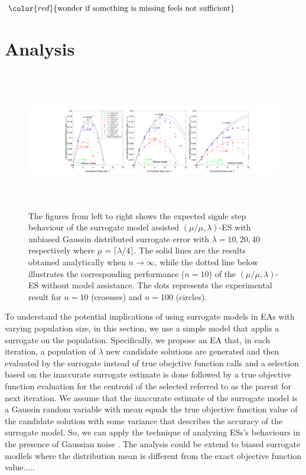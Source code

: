 $\color{red}{\text{wonder if something is missing feels not sufficient}}$



\section{Analysis}
\begin{center}
\begin{figure}
\includegraphics[height=2.4in, width=6.1in]{expectedFitGain_v1}
\caption{The figures from left to right shows the expected signle step behaviour of the surrogate model assisted $(\mu/\mu,\lambda)$-ES with unbiased Gaussin distributed surrogate error with $\lambda=10,20,40$ respectively where $\mu = \lceil \lambda/4 \rceil$. The solid lines are the results obtained analytically when $n \rightarrow \infty$, while the dotted line below illustrates the corresponding performance ($n=10$) of the $(\mu/\mu,\lambda)$-ES without model assistance. The dots represents the experimental result for $n=10$ (croesses) and $n=100$ (circles).}
\label{fig:expectedFitGain}
\end{figure}
\end{center}

To understand the potential implications of using surrogate models in EAs with varying population size, in this section, we use a simple model that applis a surrogate on the population. Specifically, we propose an EA that, in each iteration, a population of $\lambda$ new candidate solutions are generated and then evaluated by the surrogate instead of true obejctive function calls and a selection based on the inaccurate surrogate estimate is done followed by a true objective function evaluation for the centroid of the selected referred to as the parent for next iteration. We assume that the inaccurate estimate of the surrogate model is a Gaussin random variable with mean equals the true objective function value of the candidate solution with some variance that describes the accuracy of the surrogate model. So, we can apply the technique of analyzing ESs's behaviours in the presence of Gaussian noise \cite{arnold2002noisy}. The analysis could be extend to biased surrogate modlels where the distribution mean is different from the exact objective function value\cite{DBLP:conf/ppsn/KayhaniA18}.....


